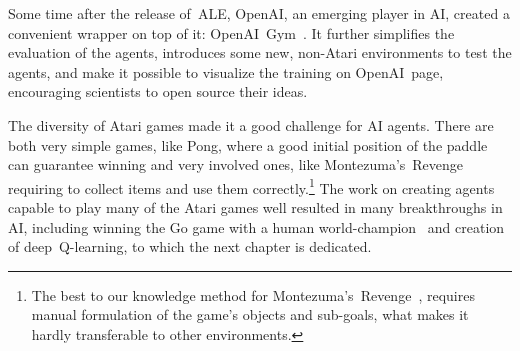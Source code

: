 Some time after the release of~ALE, OpenAI, an emerging player in AI, created a convenient wrapper on top of it: OpenAI~Gym~\cite{gym}. It further simplifies the evaluation of the agents, introduces some new, non-Atari environments to test the agents, and make it possible to visualize the training on OpenAI~page, encouraging scientists to open source their ideas.

The diversity of Atari games made it a good challenge for AI agents. There are both very simple games, like Pong, where a good initial position of the paddle can guarantee winning and very involved ones, like Montezuma's~Revenge requiring to collect items and use them correctly.\footnote{The best to our knowledge method for Montezuma's~Revenge~\cite{hdqn}, requires manual formulation of the game's objects and sub-goals, what makes it hardly transferable to other environments.} The work on creating agents capable to play many of the Atari games well resulted in many breakthroughs in AI, including winning the Go game with a human world-champion~\cite{alphago} and creation of deep~Q-learning, to which the next chapter is dedicated.
